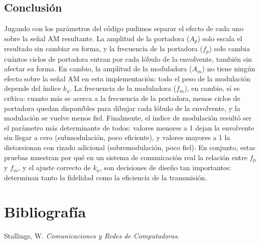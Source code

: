 \documentclass[11pt,a4paper]{article}
\newcommand{\seccionprincipal}[1]{%
    \section*{#1}\addcontentsline{toc}{section}{#1}
}
\begin{document}
\subsection*{Conclusión}

Jugando con los parámetros del código pudimos separar el efecto de cada uno sobre la señal AM resultante. La amplitud de la portadora ($A_p$) solo escala el resultado sin cambiar su forma, y la frecuencia de la portadora ($f_p$) solo cambia cuántos ciclos de portadora entran por cada lóbulo de la envolvente, también sin afectar su forma. En cambio, la amplitud de la moduladora ($A_m$) no tiene ningún efecto sobre la señal AM en esta implementación: todo el peso de la modulación depende del índice $k_a$. La frecuencia de la moduladora ($f_m$), en cambio, sí es crítica: cuanto más se acerca a la frecuencia de la portadora, menos ciclos de portadora quedan disponibles para dibujar cada lóbulo de la envolvente, y la modulación se vuelve menos fiel. Finalmente, el índice de modulación resultó ser el parámetro más determinante de todos: valores menores a 1 dejan la envolvente sin llegar a cero (submodulación, poco eficiente), y valores mayores a 1 la distorsionan con rizado adicional (sobremodulación, poco fiel). En conjunto, estas pruebas muestran por qué en un sistema de comunicación real la relación entre $f_p$ y $f_m$, y el ajuste correcto de $k_a$, son decisiones de diseño tan importantes: determinan tanto la fidelidad como la eficiencia de la transmisión.

\seccionprincipal{Bibliografía}

Stallings, W. \textit{Comunicaciones y Redes de Computadoras}.
\end{document}

